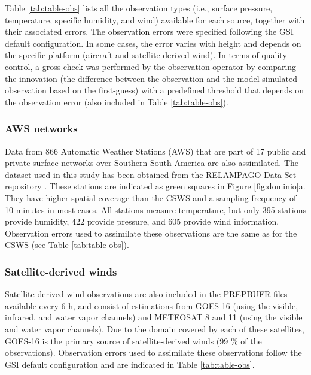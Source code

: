 \documentclass[final,5p,times,twocolumn,authoryear]{elsarticle} %
\begin{document}
Table \ref{tab:table-obs} lists all the observation types (i.e., surface pressure, temperature, specific humidity, and wind) available for each source, together with their associated errors. The observation errors were specified following the GSI default configuration. In some cases, the error varies with height and depends on the specific platform (aircraft and satellite-derived wind). In terms of quality control, a gross check was performed by the observation operator by comparing the innovation (the difference between the observation and the model-simulated observation based on the first-guess) with a predefined threshold that depends on the observation error (also included in Table \ref{tab:table-obs}).

\hypertarget{aws-networks}{%
\subsubsection{AWS networks}\label{aws-networks}}

Data from 866 Automatic Weather Stations (AWS) that are part of 17 public and private surface networks over Southern South America are also assimilated. The dataset used in this study has been obtained from the RELAMPAGO Data Set repository \citep{garcia2019}. These stations are indicated as green squares in Figure \ref{fig:dominio}a. They have higher spatial coverage than the CSWS and a sampling frequency of 10 minutes in most cases. All stations measure temperature, but only 395 stations provide humidity, 422 provide pressure, and 605 provide wind information.
Observation errors used to assimilate these observations are the same as for the CSWS (see Table \ref{tab:table-obs}).

\hypertarget{satellite-derived-winds}{%
\subsubsection{Satellite-derived winds}\label{satellite-derived-winds}}

Satellite-derived wind observations are also included in the PREPBUFR files available every 6 h, and consist of estimations from GOES-16 (using the visible, infrared, and water vapor channels) and METEOSAT 8 and 11 (using the visible and water vapor channels). Due to the domain covered by each of these satellites, GOES-16 is the primary source of satellite-derived winds (99 \% of the observations). Observation errors used to assimilate these observations follow the GSI default configuration and are indicated in Table \ref{tab:table-obs}.
\end{document}
